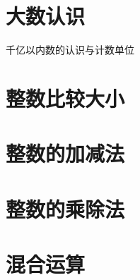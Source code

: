 


\section{大数认识}
千亿以内数的认识与计数单位
\section{整数比较大小}
\section{整数的加减法}
\section{整数的乘除法}
\section{混合运算}






\vspace{1em}
\newpage


















